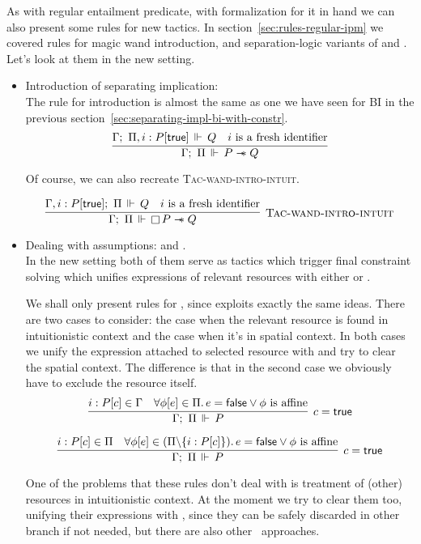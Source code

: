 As with regular entailment predicate, with formalization for it in hand we can also present some rules for new tactics.
In section~\ref{sec:rules-regular-ipm} we covered rules for magic wand introduction,  and separation-logic variants of  and .
Let's look at them in the new setting.

\begin{itemize}
\item Introduction of separating implication: \\
  The rule for introduction is almost the same as one we have seen for BI in the previous section~\ref{sec:separating-impl-bi-with-constr}.
  \[
  \infer{\entailsD P \wand Q}
        {\entails {\IntuD} {\SpatD, i : P[\true]} {Q} &
         i \text{ is a fresh identifier}}
  \]

  Of course, we can also recreate \textsc{Tac-wand-intro-intuit}.

  \[\infer[\textsc{Tac-wand-intro-intuit}]
      {\entailsD \intuit P \wand Q}
      {\entails {\IntuD, i : P[\true]} {\SpatD} {Q} &
       i \text{ is a fresh identifier}}
  \]

\item Dealing with assumptions:  and .\\
  In the new setting both of them serve as tactics which trigger final constraint solving which unifies expressions of relevant resources with either \true or \false.

  We shall only present rules for , since  exploits exactly the same ideas.
  There are two cases to consider: the case when the relevant resource is found in intuitionistic context and the case when it's in spatial context.
  In both cases we unify the expression attached to selected resource with \true and try to clear the spatial context.
  The difference is that in the second case we obviously have to exclude the resource itself.
  \[
    \infer[c = \true]
          {\entailsD P}
          {i : P[c] \in \IntuD &
           \forall \phi[e] \in \SpatD.\, e = \false \vee \phi \text{ is affine}}
  \]

  \[
    \infer[c = \true]
          {\entailsD P}
          {i : P[c] \in \SpatD &
           \forall \phi[e] \in (\SpatD \backslash \{i : P[c]\}).\, e = \false \vee \phi \text{ is affine}}
  \]

  One of the problems that these rules don't deal with is treatment of (other) resources in intuitionistic context.
  At the moment we try to clear them too, unifying their expressions with \false, since they can be safely discarded in other branch if not needed, but there are also other~\cite[Section 15.3]{pfenningLogicProgrammingLecture2007} approaches.


\end{itemize}
